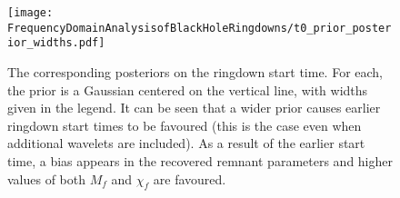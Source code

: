 \begin{figure}
    \centering
    \texttt{[image: FrequencyDomainAnalysisofBlackHoleRingdowns/t0\_prior\_posterior\_widths.pdf]}
    \caption[SHORT CAPTION]{ 
    The corresponding posteriors on the ringdown start time. For each, the prior is a Gaussian centered on the vertical line, with widths given in the legend.
    It can be seen that a wider prior causes earlier ringdown start times to be favoured (this is the case even when additional wavelets are included). As a result of the earlier start time, a bias appears in the recovered remnant parameters and higher values of both $M_f$ and $\chi_f$ are favoured.
    }
    \label{fig:start_time_posterior}
\end{figure}


